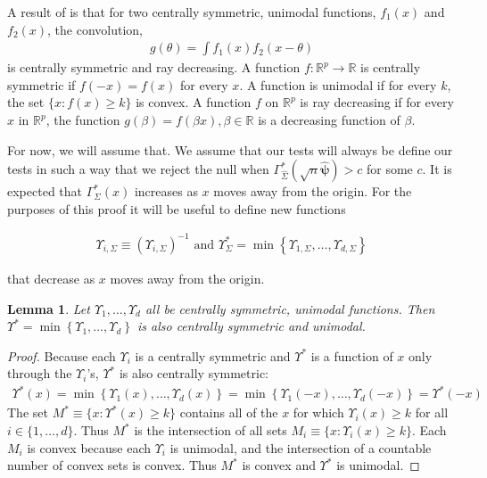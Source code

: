 \documentclass{article}
\newtheorem{lemma}[theorem]{Lemma}
\newcommand{\vmat}{\Sigma}
\newcommand{\gi}{\Upsilon}
\begin{document}
A result of \citep{anderson_integral_1955} is that for two centrally symmetric, unimodal functions, $f_1(x)$ and  $f_2(x)$, the convolution,  
\begin{align*}
	g(\theta) = \int f_1(x) f_2(x - \theta)
\end{align*}
is centrally symmetric and ray decreasing.  A function $f :\mathbb{R}^p\rightarrow\mathbb{R}$ is centrally symmetric if $f(-x) = f(x)$ for every $x$.  A function is unimodal if for every $k$, the set $\{x : f(x) \geq k\}$ is convex. A function $f$ on $\mathbb{R}^p$ is ray decreasing if for every $x$ in $\mathbb{R}^p$, the function $g(\beta) = f(\beta x), \beta \in \mathbb{R}$ is a decreasing function of $\beta$.

For now, we will assume that.  We assume that our tests will always be define our tests in such a way that we reject the null when $\Gamma^*_{\hat{\vmat}}(\sqrt{n} \hat{\boldsymbol{\psi}}) > c$ for some $c$. It is expected that $\Gamma^*_{\vmat}(x)$  increases as $x$ moves away from the origin. For the purposes of this proof it will be useful to define new functions 

\begin{align*}
	\gi_{i, \Sigma} \equiv \left(\gi_{i, \Sigma}\right)^{-1} \text{ and } \gi_{\Sigma}^* = \min\left\{\gi_{1, \Sigma}, \dots, \gi_{d, \Sigma}\right\}
\end{align*} 

that decrease as $x$ moves away from the origin.   

\begin{lemma}
	\label{lemma:min_cent_sym_unm}
	Let $\gi_1, \dots, \gi_d$ all be centrally symmetric, unimodal functions.  Then $\gi^* = \min\left\{\gi_1, \dots, \gi_d\right\}$ is also centrally symmetric and unimodal.
\end{lemma}
\begin{proof}
Because each $\gi_i$ is a centrally symmetric and $\gi^*$ is a function of $x$ only through the $\gi_i$'s, $\gi^*$ is also centrally symmetric:
	\begin{align*}
	\gi^*(x) = \min\left\{\gi_1(x), \dots, \gi_d(x)\right\} = \min\left\{\gi_1(-x), \dots, \gi_d(-x)\right\} = \gi^*(-x)
	\end{align*}
The set $M^* \equiv \{x : \gi^*(x) \geq k\}$ contains all of the $x$ for which $\gi_i(x) \geq k$ for all $i \in \{1, \dots, d\}$.  Thus $M^*$ is the intersection of all sets $M_i \equiv \{x : \gi_i(x) \geq k\}$.  Each $M_i$ is convex because each $\gi_i$ is unimodal, and the intersection of a countable number of convex sets is convex.  Thus $M^*$ is convex and $\gi^*$ is unimodal.
\end{proof}
\end{document}
